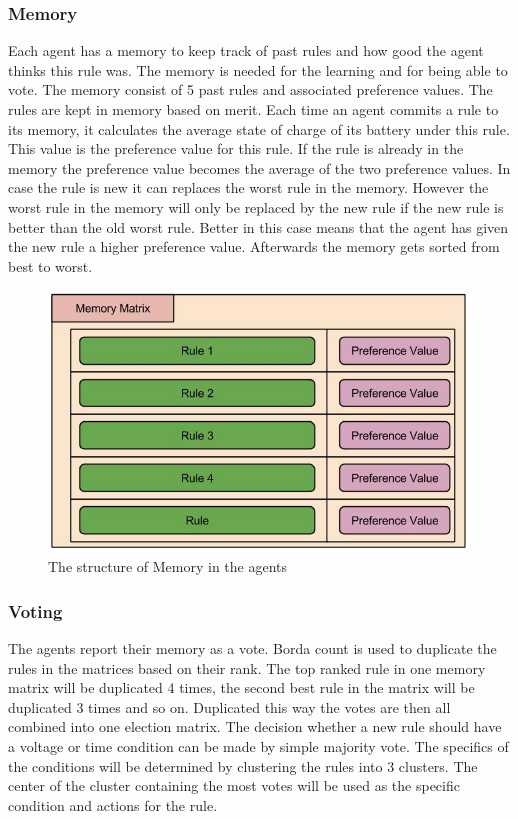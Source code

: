 \documentclass[a4paper]{article}
\begin{document}
\subsubsection{Memory}
Each agent has a memory to keep track of past rules and how good the agent thinks this rule was. The memory 
is needed for the learning and for being able to vote. The memory consist of 5 past rules and associated preference 
values. The rules are kept in memory based on merit.
Each time an agent commits a rule to its memory, it calculates the average state of charge of its battery under this rule. 
This value is the preference value for this rule. If the rule is already in the memory the preference value becomes the 
average of the two preference values. In case the rule is new it can replaces the worst rule in the memory.
However the worst rule in the memory will only be replaced by the new rule if the new rule is better than the old worst rule. 
Better in this case means that the agent has given the new rule a higher preference value. 
Afterwards the memory gets sorted from best to worst. 

\begin{figure}[!ht]
\includegraphics[width =\textwidth]{concept_memory.jpg}
\caption{The structure of Memory in the agents}
\label{Memory_structure}
\end{figure}


\subsubsection{Voting}
The agents report their memory as a vote. Borda count is used to duplicate the rules in the matrices based on their rank. 
The top ranked rule in one memory matrix will be duplicated 4 times, the second best rule in the matrix will be duplicated 3
times and so on. Duplicated this way the votes are then all combined into one election matrix. The decision whether a new rule
should have a voltage or time condition can be made by simple majority vote. The specifics of the conditions will be 
determined by clustering the rules into 3 clusters. The center of the cluster containing the most votes will be used as 
the specific condition and actions for the rule.
\end{document}
